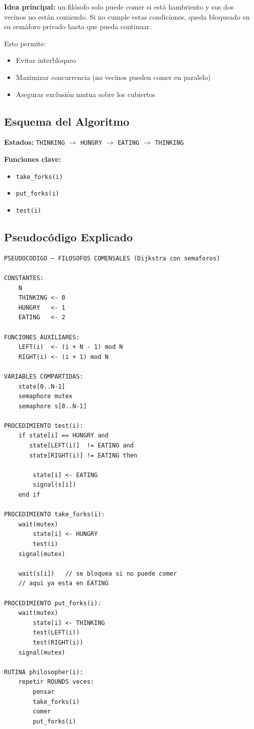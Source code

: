 \documentclass[12pt]{article}
\begin{document}
\textbf{Idea principal:} un filósofo solo puede comer si está hambriento y sus dos vecinos no están comiendo. Si no cumple estas condiciones, queda bloqueado en su semáforo privado hasta que pueda continuar.

Esto permite:
\begin{itemize}
  \item Evitar interbloqueo
  \item Maximizar concurrencia (no vecinos pueden comer en paralelo)
  \item Asegurar exclusión mutua sobre los cubiertos
\end{itemize}

\subsection{Esquema del Algoritmo}
\label{subsec:esquema}

\textbf{Estados:} \texttt{THINKING} $\rightarrow$ \texttt{HUNGRY} $\rightarrow$ \texttt{EATING} $\rightarrow$ \texttt{THINKING}

\textbf{Funciones clave:}
\begin{itemize}
  \item \texttt{take\_forks(i)}
  \item \texttt{put\_forks(i)}
  \item \texttt{test(i)}
\end{itemize}

\subsection{Pseudocódigo Explicado}
\label{subsec:pseudocodigo}

\lstset{style=txtstyle}
\begin{lstlisting}
PSEUDOCODIGO — FILOSOFOS COMENSALES (Dijkstra con semaforos)

CONSTANTES:
    N
    THINKING <- 0
    HUNGRY   <- 1
    EATING   <- 2

FUNCIONES AUXILIARES:
    LEFT(i)  <- (i + N - 1) mod N
    RIGHT(i) <- (i + 1) mod N

VARIABLES COMPARTIDAS:
    state[0..N-1]
    semaphore mutex
    semaphore s[0..N-1]

PROCEDIMIENTO test(i):
    if state[i] == HUNGRY and
       state[LEFT(i)]  != EATING and
       state[RIGHT(i)] != EATING then

        state[i] <- EATING
        signal(s[i])
    end if

PROCEDIMIENTO take_forks(i):
    wait(mutex)
        state[i] <- HUNGRY
        test(i)
    signal(mutex)

    wait(s[i])   // se bloquea si no puede comer
    // aqui ya esta en EATING

PROCEDIMIENTO put_forks(i):
    wait(mutex)
        state[i] <- THINKING
        test(LEFT(i))
        test(RIGHT(i))
    signal(mutex)

RUTINA philosopher(i):
    repetir ROUNDS veces:
        pensar
        take_forks(i)
        comer
        put_forks(i)
\end{lstlisting}
\end{document}
